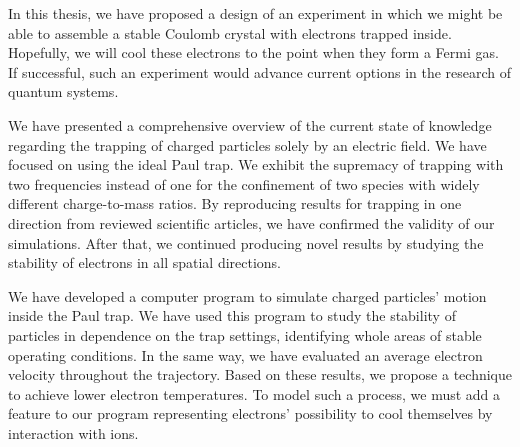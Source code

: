 

In this thesis, we have proposed a design of an experiment in which we might be able to assemble a stable Coulomb crystal with electrons trapped inside. Hopefully, we will cool these electrons to the point when they form a Fermi gas. If successful, such an experiment would advance current options in the research of quantum systems.

We have presented a comprehensive overview of the current state of knowledge regarding the trapping of charged particles solely by an electric field. We have focused on using the ideal Paul trap. We exhibit the supremacy of trapping with two frequencies instead of one for the confinement of two species with widely different charge-to-mass ratios. By reproducing results for trapping in one direction from reviewed scientific articles, we have confirmed the validity of our simulations. After that, we continued producing novel results by studying the stability of electrons in all spatial directions.

We have developed a computer program to simulate charged particles' motion inside the Paul trap. We have used this program to study the stability of particles in dependence on the trap settings, identifying whole areas of stable operating conditions. In the same way, we have evaluated an average electron velocity throughout the trajectory. Based on these results, we propose a technique to achieve lower electron temperatures. To model such a process, we must add a feature to our program representing electrons' possibility to cool themselves by interaction with ions. 

